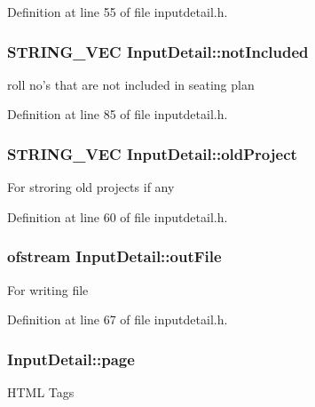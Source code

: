 \-Definition at line 55 of file inputdetail.\-h.

\hypertarget{classInputDetail_aba862d64d7f84a385e528d0daf42e9fc}{
\subsubsection[{not\-Included}]{\setlength{\rightskip}{0pt plus 5cm}\-S\-T\-R\-I\-N\-G\-\_\-\-V\-E\-C {\bf \-Input\-Detail\-::not\-Included}}}\label{db/d6e/classInputDetail_aba862d64d7f84a385e528d0daf42e9fc}
roll no's that are not included in seating plan 

\-Definition at line 85 of file inputdetail.\-h.

\hypertarget{classInputDetail_ae8ccc2e838c6d5a93ea544370dc1f272}{
\subsubsection[{old\-Project}]{\setlength{\rightskip}{0pt plus 5cm}\-S\-T\-R\-I\-N\-G\-\_\-\-V\-E\-C {\bf \-Input\-Detail\-::old\-Project}}}\label{db/d6e/classInputDetail_ae8ccc2e838c6d5a93ea544370dc1f272}
\-For stroring old projects if any 

\-Definition at line 60 of file inputdetail.\-h.

\hypertarget{classInputDetail_a2b8484cfbfee98ae69e8476f8fd40000}{
\subsubsection[{out\-File}]{\setlength{\rightskip}{0pt plus 5cm}ofstream {\bf \-Input\-Detail\-::out\-File}}}\label{db/d6e/classInputDetail_a2b8484cfbfee98ae69e8476f8fd40000}
\-For writing file 

\-Definition at line 67 of file inputdetail.\-h.

\hypertarget{classInputDetail_ae487757aaafba4ac372c327e2b7a9673}{
\subsubsection[{page}]{ {\bf \-Input\-Detail\-::page}}}\label{db/d6e/classInputDetail_ae487757aaafba4ac372c327e2b7a9673}
\-H\-T\-M\-L \-Tags 

